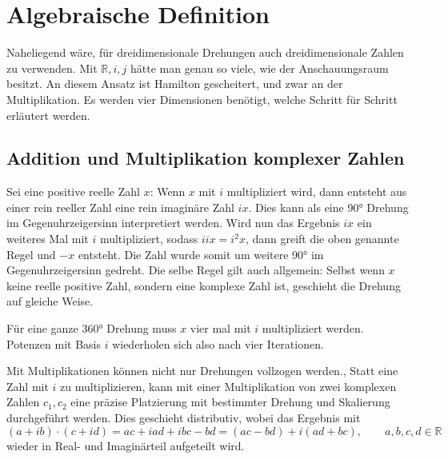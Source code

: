 %
%
%
%

\section{Algebraische Definition\label{qa:section:definition}}

Naheliegend wäre, für dreidimensionale Drehungen auch dreidimensionale
Zahlen zu verwenden. Mit $\mathbb{R}, i, j$ hätte man genau so viele, wie der
Anschauungsraum besitzt. An diesem Ansatz ist Hamilton gescheitert, 
und zwar an der Multiplikation. Es werden vier Dimensionen benötigt, 
welche Schritt für Schritt erläutert werden.


\subsection{Addition und Multiplikation komplexer Zahlen}
Sei eine positive reelle Zahl $x$: Wenn $x$ mit $i$ multipliziert 
wird, dann entsteht aus einer rein reeller Zahl eine rein imaginäre 
Zahl $ix$. Dies kann als eine 90° Drehung im Gegenuhrzeigersinn 
interpretiert werden. Wird nun das Ergebnis $ix$ ein weiteres Mal 
mit $i$ multipliziert, sodass $iix = i^2x$, dann greift die oben 
genannte Regel und $-x$ entsteht. Die Zahl wurde somit um weitere 
90° im Gegenuhrzeigersinn gedreht. Die selbe Regel gilt auch 
allgemein: Selbst wenn $x$ keine reelle positive Zahl, sondern eine 
komplexe Zahl ist, geschieht die Drehung auf gleiche Weise. 

Für eine ganze 360° Drehung muss $x$ vier mal mit $i$ multipliziert 
werden. Potenzen mit Basis $i$ wiederholen sich also nach vier 
Iterationen.


Mit Multiplikationen können nicht nur Drehungen vollzogen werden., 
Statt eine Zahl mit $i$ zu multiplizieren, kann mit einer 
Multiplikation von zwei komplexen Zahlen $c_1, c_2$ eine präzise 
Platzierung mit bestimmter Drehung und Skalierung durchgeführt 
werden. Dies geschieht distributiv, wobei das Ergebnis mit
\begin{equation*}
    (a + ib) \cdot (c + id) 
    = ac + iad + ibc - bd = 
    (ac - bd) + i(ad + bc), \qquad a,b,c,d \in \mathbb{R}
\end{equation*}
wieder in Real- und Imaginärteil aufgeteilt wird.


